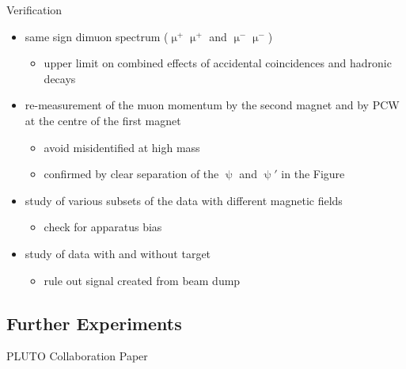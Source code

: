 \begin{frame}{Verification}

	\begin{itemize}\itemfill
		\item same sign dimuon spectrum ($\upmu^{+}\upmu^{+}$ and $\upmu^{-}\upmu^{-}$)
		\begin{itemize}
			\item upper limit on combined effects of accidental coincidences and hadronic decays
		\end{itemize}
		\item re-measurement of the muon momentum by the second magnet and by PCW at the centre of the first magnet
		\begin{itemize}
			\item avoid misidentified \ch{\ensuremath{\uppsi}->\ensuremath{\upmu^+}+\ensuremath{\upmu^-}} at high mass
			\item confirmed by clear separation of the $\uppsi$ and $\uppsi'$ in the Figure
		\end{itemize}
	\end{itemize}
	
	\begin{minipage}[c][.35\textheight]{0.58\textwidth}
		\begin{itemize}\itemfill
			\item study of various subsets of the data with different magnetic fields
			\begin{itemize}
				\item check for apparatus bias
			\end{itemize}
			\item study of data with and without target
			\begin{itemize}
				\item rule out signal created from beam dump
			\end{itemize}
		\end{itemize}
	\end{minipage}
	\begin{minipage}{.4\textwidth}
	\end{minipage}\vspace*{-20pt}

	
\end{frame}

\subsection{Further Experiments}
\begin{frame}{PLUTO Collaboration Paper}

	
\end{frame}

